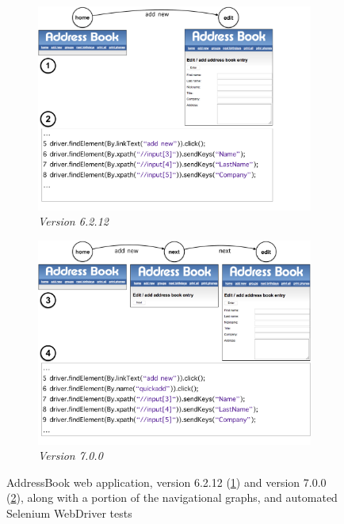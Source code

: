 \begin{figure}[t]
\centering
\begin{subfigure}{\columnwidth}
\centering
\includegraphics[trim=0cm 0cm 0cm 0cm, clip=true, scale=0.225]{images/misselection-part1.pdf}
\caption{\emph{Version 6.2.12}}
\label{fig:ab1} 
\end{subfigure}
\begin{subfigure}{\columnwidth}
\centering
\includegraphics[trim=0cm 0cm 0cm 0cm, clip=true, scale=0.225]{images/misselection-part2.pdf}
\caption{\emph{Version 7.0.0}}
\label{fig:ab2} 
\end{subfigure}
\caption{AddressBook web application, version 6.2.12 (\ref{fig:ab1}) and version 7.0.0 (\ref{fig:ab2}), along with a portion of the navigational graphs, and automated Selenium WebDriver tests}
\label{misselection}
\end{figure}

